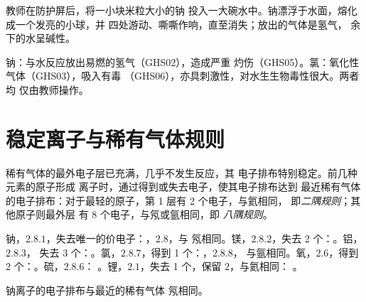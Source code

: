 \begin{inthelab}[钠与水]
教师在防护屏后，将一小块米粒大小的钠
投入一大碗水中。钠漂浮于水面，熔化成一个发亮的小球，并
四处游动、嘶嘶作响，直至消失；放出的气体是氢气，
余下的水呈碱性。
\end{inthelab}

\begin{safety}{\quad{}}
钠：与水反应放出易燃的氢气（GHS02），造成严重
灼伤（GHS05）。氯：氧化性气体（GHS03），吸入有毒
（GHS06），亦具刺激性，对水生生物毒性很大。两者均
仅由教师操作。
\end{safety}

\section{稳定离子与稀有气体规则}

\begin{definition}[二隅规则与八隅规则]\label{def:g10:electron-shells:octet}
稀有气体的最外电子层已充满，几乎不发生反应，其
电子排布特别稳定。前几种元素的原子形成
离子时，通过得到或失去电子，使其电子排布达到
最近稀有气体的电子排布：对于最轻的原子，第 1 层有 2 个电子，与氦相同，
即\emph{二隅规则}；其他原子则最外层
有 8 个电子，与氖或氩相同，即
\emph{八隅规则}。
\end{definition}

\begin{example}[规则预测的离子]\label{ex:g10:electron-shells:ions}
钠，$2.8.1$，失去唯一的价电子：，$2.8$，与
氖相同。镁，$2.8.2$，失去 2 个：。铝，$2.8.3$，
失去 3 个：。氯，$2.8.7$，得到 1 个：，$2.8.8$，
与氩相同。氧，$2.6$，得到 2 个：。硫，$2.8.6$：
。锂，$2.1$，失去 1 个，保留 $2$，与氦相同：
。
\end{example}

\begin{omfigure}

{\small 钠离子的电子排布与最近的稀有气体
氖相同。}
\end{omfigure}

